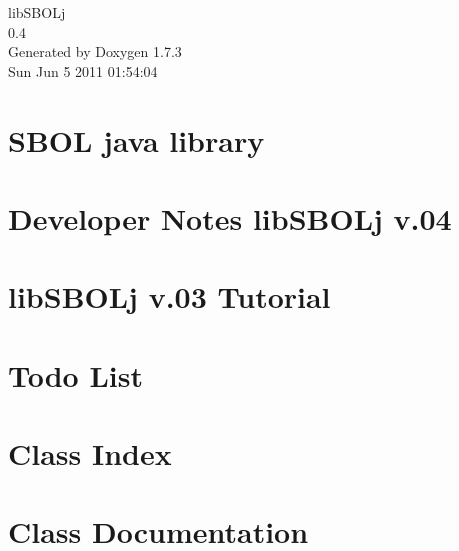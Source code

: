 \documentclass[a4paper]{book}
\begin{document}
\hypersetup{pageanchor=false}
\begin{titlepage}
\vspace*{7cm}
\begin{center}
{\Large libSBOLj \\[1ex]\large 0.4 }\\
\vspace*{1cm}
{\large Generated by Doxygen 1.7.3}\\
\vspace*{0.5cm}
{\small Sun Jun 5 2011 01:54:04}\\
\end{center}
\end{titlepage}
\clearemptydoublepage
{}
\tableofcontents
\clearemptydoublepage
{}
\hypersetup{pageanchor=true}
\chapter{SBOL java library}
\label{index}\hypertarget{index}{}
\chapter{Developer Notes libSBOLj v.04}
\label{devnotes}
\hypertarget{devnotes}{}

\chapter{libSBOLj v.03 Tutorial}
\label{tutorial}
\hypertarget{tutorial}{}

\chapter{Todo List}
\label{todo}
\hypertarget{todo}{}

\chapter{Class Index}

\chapter{Class Documentation}















\printindex
\end{document}

